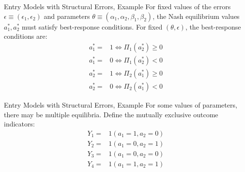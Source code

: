 \documentclass[aspectratio=169,11pt]{beamer}
\begin{document}
\begin{frame}{Entry Models with Structural Errors, Example}
For fixed values of the errors $\epsilon \equiv (\epsilon_1, \epsilon_2)$ and parameters $\theta \equiv (\alpha_1, \alpha_2, \beta_1, \beta_2)$, the Nash equilibrium values $a^*_1, a^*_2$ must satisfy best-response conditions. For fixed $(\theta, \epsilon)$, the best-response conditions are:
\begin{equation*}
\begin{split}
a^*_1 = & 1 \Leftrightarrow \Pi_1 (a^*_2) \geq 0 \\
a^*_1 = & 0 \Leftrightarrow \Pi_1 (a^*_2) < 0 \\
a^*_2 = & 1 \Leftrightarrow \Pi_2 (a^*_1) \geq 0 \\
a^*_2 = & 0 \Leftrightarrow \Pi_2 (a^*_1) < 0
\end{split}
\end{equation*}
\end{frame}

\begin{frame}{Entry Models with Structural Errors, Example}
For some values of parameters, there may be multiple equilibria. Define the mutually exclusive outcome indicators:
\begin{equation*}
\begin{split}
Y_1 = & 1 (a_1 = 1, a_2 = 0) \\
Y_2 = & 1 (a_1 = 0, a_2 = 1) \\
Y_3 = & 1 (a_1 = 0, a_2 = 0) \\
Y_4 = & 1 (a_1 = 1, a_2 = 1) 
\end{split}
\end{equation*}
\end{frame}
\end{document}
